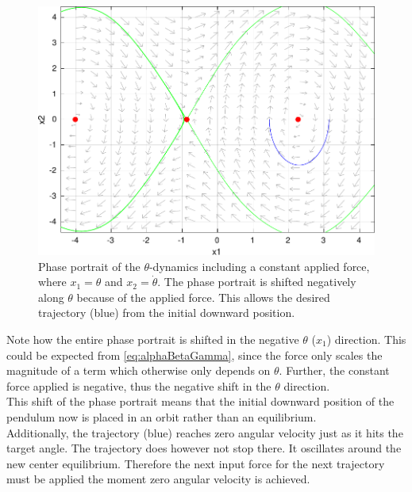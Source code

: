 \begin{figure}[H]
  \includegraphics[width=.8\textwidth]{figures/firstTrajectory}
  \caption{Phase portrait of the $\theta$-dynamics including a constant applied force, where $x_1 = \theta$ and $x_2 = \dot{\theta}$. The phase portrait is shifted negatively along $\theta$ because of the applied force. This allows the desired trajectory (blue) from the initial downward position.}
  \label{fig:phasePortraitFirstTrajectry}
\end{figure}

Note how the entire phase portrait is shifted in the negative $\theta$ ($x_1$) direction. This could be expected from \autoref{eq:alphaBetaGamma}, since the force only scales the magnitude of a term which otherwise only depends on $\theta$. Further, the constant force applied is negative, thus the negative shift in the $\theta$ direction.\\
This shift of the phase portrait means that the initial downward position of the pendulum now is placed in an orbit rather than an equilibrium.\\
Additionally, the trajectory (blue) reaches zero angular velocity just as it hits the target angle. The trajectory does however not stop there. It oscillates around the new center equilibrium. Therefore the next input force for the next trajectory must be applied the moment zero angular velocity is achieved.